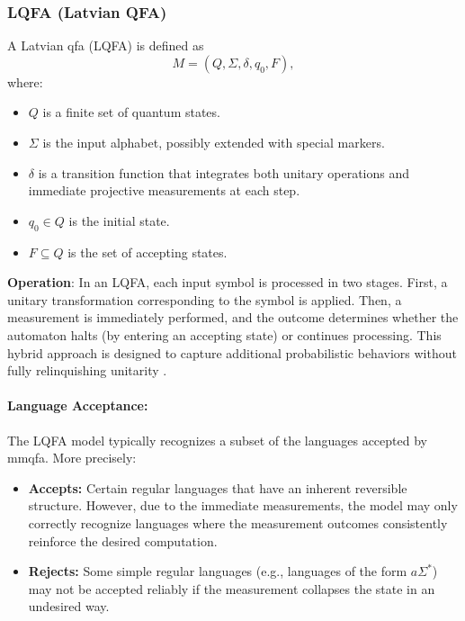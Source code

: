 \subsubsection{LQFA (Latvian QFA)}
\label{sssec:lqfa}
\begin{definition}[LQFA]
A Latvian \gls{qfa} (LQFA) is defined as 
\[
M = (Q, \Sigma, \delta, q_0, F),
\]
where:
\begin{itemize}
    \item \( Q \) is a finite set of quantum states.
    \item \( \Sigma \) is the input alphabet, possibly extended with special markers.
    \item \( \delta \) is a transition function that integrates both unitary operations and immediate projective measurements at each step.
    \item \( q_0 \in Q \) is the initial state.
    \item \( F \subseteq Q \) is the set of accepting states.
\end{itemize}
\end{definition}

\textbf{Operation}:  
In an LQFA, each input symbol is processed in two stages. First, a unitary transformation corresponding to the symbol is applied. Then, a measurement is immediately performed, and the outcome determines whether the automaton halts (by entering an accepting state) or continues processing. This hybrid approach is designed to capture additional probabilistic behaviors without fully relinquishing unitarity \cite{ambainis2002quantum}.

\paragraph{Language Acceptance:}  
The LQFA model typically recognizes a subset of the languages accepted by \gls{mmqfa}. More precisely:
\begin{itemize}
    \item \textbf{Accepts:} Certain regular languages that have an inherent reversible structure. However, due to the immediate measurements, the model may only correctly recognize languages where the measurement outcomes consistently reinforce the desired computation.
    \item \textbf{Rejects:} Some simple regular languages (e.g., languages of the form \( a\Sigma^* \)) may not be accepted reliably if the measurement collapses the state in an undesired way.
\end{itemize}

